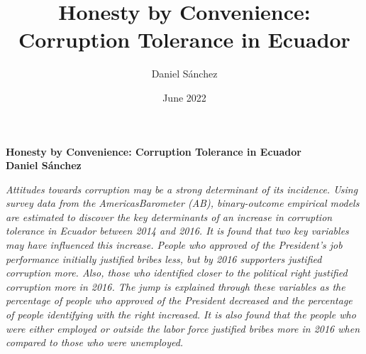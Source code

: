 \documentclass[12pt,a4]{article}
\title{Honesty by Convenience: Corruption Tolerance in Ecuador}
\author{Daniel Sánchez}
\date{June 2022}
\begin{document}


\begin{center}
\textbf{
Honesty by Convenience: Corruption Tolerance in Ecuador\\
Daniel Sánchez}
\end{center}

\textit{
Attitudes towards corruption may be a strong determinant of its incidence. Using survey
data from the AmericasBarometer (AB), binary-outcome empirical models are estimated to discover
the key determinants of an increase in corruption tolerance in Ecuador between 2014 and
2016. It is found that two key variables may have influenced this increase. People who approved
of the President’s job performance initially justified bribes less, but by 2016 supporters justified corruption more. Also, those who identified closer to the political right justified corruption more in 2016. The jump is explained through these variables as the percentage of people who approved of the President decreased and the percentage of people identifying with the right increased. It is also found that the people who were either employed or outside the labor force justified bribes more in 2016 when compared to those who were unemployed.}
\end{document}

